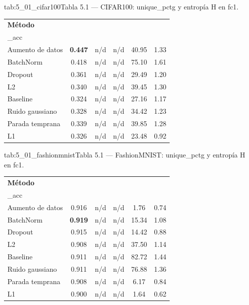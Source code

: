 \begin{table}{tab:5_01_cifar100}{Tabla 5.1 — CIFAR100: unique\_pctg y entropía H en fc1.}
\small
\begin{tabular}{lccccc}
\toprule
\textbf{Método} & \textbf{val\\_acc} & \textbf{uniq 30 (\\%
\midrule
Aumento de datos & \textbf{0.447} & n/d & n/d & 40.95 & 1.33 \\
BatchNorm & 0.418 & n/d & n/d & 75.10 & 1.61 \\
Dropout & 0.361 & n/d & n/d & 29.49 & 1.20 \\
L2 & 0.340 & n/d & n/d & 39.45 & 1.30 \\
Baseline & 0.324 & n/d & n/d & 27.16 & 1.17 \\
Ruido gaussiano & 0.328 & n/d & n/d & 34.42 & 1.23 \\
Parada temprana & 0.339 & n/d & n/d & 39.85 & 1.28 \\
L1 & 0.326 & n/d & n/d & 23.48 & 0.92 \\
\bottomrule
\end{tabular}
\end{table}

\begin{table}{tab:5_01_fashionmnist}{Tabla 5.1 — FashionMNIST: unique\_pctg y entropía H en fc1.}
\small
\begin{tabular}{lccccc}
\toprule
\textbf{Método} & \textbf{val\\_acc} & \textbf{uniq 30 (\\%
\midrule
Aumento de datos & 0.916 & n/d & n/d & 1.76 & 0.74 \\
BatchNorm & \textbf{0.919} & n/d & n/d & 15.34 & 1.08 \\
Dropout & 0.915 & n/d & n/d & 14.42 & 0.88 \\
L2 & 0.908 & n/d & n/d & 37.50 & 1.14 \\
Baseline & 0.911 & n/d & n/d & 82.72 & 1.44 \\
Ruido gaussiano & 0.911 & n/d & n/d & 76.88 & 1.36 \\
Parada temprana & 0.908 & n/d & n/d & 6.17 & 0.84 \\
L1 & 0.900 & n/d & n/d & 1.64 & 0.62 \\
\bottomrule
\end{tabular}
\end{table}